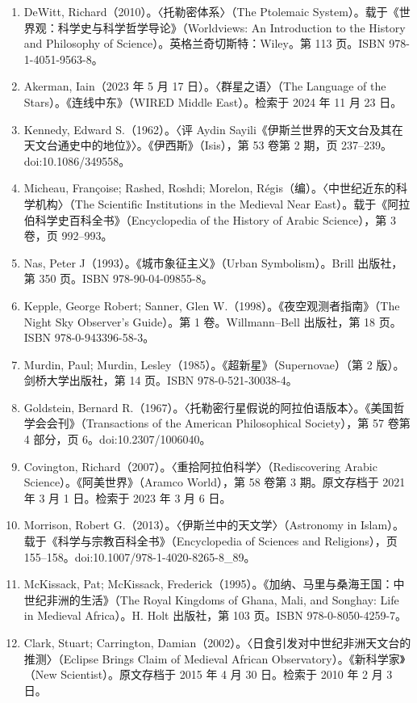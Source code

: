 \begin{enumerate}
  \item DeWitt, Richard（2010）。〈托勒密体系〉（The Ptolemaic System）。载于《世界观：科学史与科学哲学导论》（Worldviews: An Introduction to the History and Philosophy of Science）。英格兰奇切斯特：Wiley。第 113 页。ISBN 978-1-4051-9563-8。
  \item Akerman, Iain（2023 年 5 月 17 日）。〈群星之语〉（The Language of the Stars）。《连线中东》（WIRED Middle East）。检索于 2024 年 11 月 23 日。
  \item Kennedy, Edward S.（1962）。〈评 Aydin Sayili《伊斯兰世界的天文台及其在天文台通史中的地位》〉。《伊西斯》（Isis），第 53 卷第 2 期，页 237–239。doi:10.1086/349558。
  \item Micheau, Françoise; Rashed, Roshdi; Morelon, Régis（编）。〈中世纪近东的科学机构〉（The Scientific Institutions in the Medieval Near East）。载于《阿拉伯科学史百科全书》（Encyclopedia of the History of Arabic Science），第 3 卷，页 992–993。
  \item Nas, Peter J（1993）。《城市象征主义》（Urban Symbolism）。Brill 出版社，第 350 页。ISBN 978-90-04-09855-8。
  \item Kepple, George Robert; Sanner, Glen W.（1998）。《夜空观测者指南》（The Night Sky Observer’s Guide）。第 1 卷。Willmann–Bell 出版社，第 18 页。ISBN 978-0-943396-58-3。
  \item Murdin, Paul; Murdin, Lesley（1985）。《超新星》（Supernovae）（第 2 版）。剑桥大学出版社，第 14 页。ISBN 978-0-521-30038-4。
  \item Goldstein, Bernard R.（1967）。〈托勒密行星假说的阿拉伯语版本〉。《美国哲学会会刊》（Transactions of the American Philosophical Society），第 57 卷第 4 部分，页 6。doi:10.2307/1006040。
  \item Covington, Richard（2007）。〈重拾阿拉伯科学〉（Rediscovering Arabic Science）。《阿美世界》（Aramco World），第 58 卷第 3 期。原文存档于 2021 年 3 月 1 日。检索于 2023 年 3 月 6 日。
  \item Morrison, Robert G.（2013）。〈伊斯兰中的天文学〉（Astronomy in Islam）。载于《科学与宗教百科全书》（Encyclopedia of Sciences and Religions），页 155–158。doi:10.1007/978-1-4020-8265-8\_89。
  \item McKissack, Pat; McKissack, Frederick（1995）。《加纳、马里与桑海王国：中世纪非洲的生活》（The Royal Kingdoms of Ghana, Mali, and Songhay: Life in Medieval Africa）。H. Holt 出版社，第 103 页。ISBN 978-0-8050-4259-7。
  \item Clark, Stuart; Carrington, Damian（2002）。〈日食引发对中世纪非洲天文台的推测〉（Eclipse Brings Claim of Medieval African Observatory）。《新科学家》（New Scientist）。原文存档于 2015 年 4 月 30 日。检索于 2010 年 2 月 3 日。

\end{enumerate}
